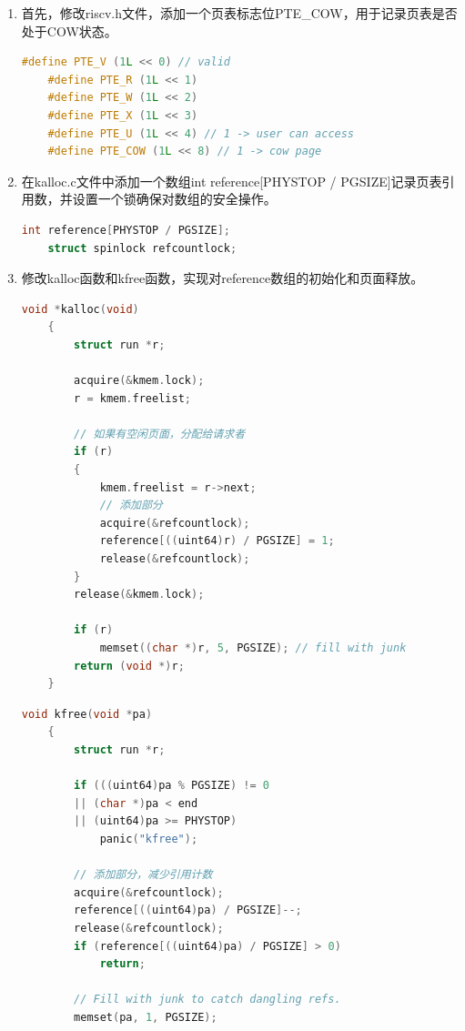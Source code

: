 \begin{enumerate}
    \item 首先，修改riscv.h文件，添加一个页表标志位PTE\_COW，用于记录页表是否处于COW状态。
          \begin{lstlisting}[language=c,title=对riscv.h文件的修改]
    #define PTE_V (1L << 0) // valid
    #define PTE_R (1L << 1)
    #define PTE_W (1L << 2)
    #define PTE_X (1L << 3)
    #define PTE_U (1L << 4) // 1 -> user can access
    #define PTE_COW (1L << 8) // 1 -> cow page
    \end{lstlisting}
    \item 在kalloc.c文件中添加一个数组int reference[PHYSTOP / PGSIZE]记录页表引用数，并设置一个锁确保对数组的安全操作。
          \begin{lstlisting}[language=c,title=添加记录引用数的数组和锁]
    int reference[PHYSTOP / PGSIZE];
    struct spinlock refcountlock;
    \end{lstlisting}
    \item 修改kalloc函数和kfree函数，实现对reference数组的初始化和页面释放。
          \begin{lstlisting}[language=c,title=对kalloc函数的修改]
    void *kalloc(void)
    {
        struct run *r;

        acquire(&kmem.lock);
        r = kmem.freelist;
        
        // 如果有空闲页面，分配给请求者
        if (r)
        {
            kmem.freelist = r->next;
            // 添加部分
            acquire(&refcountlock);
            reference[((uint64)r) / PGSIZE] = 1;
            release(&refcountlock);
        }
        release(&kmem.lock);

        if (r)
            memset((char *)r, 5, PGSIZE); // fill with junk
        return (void *)r;
    }
    \end{lstlisting}
          \begin{lstlisting}[language=c,title=对kfree函数的修改]
    void kfree(void *pa)
    {
        struct run *r;
        
        if (((uint64)pa % PGSIZE) != 0 
        || (char *)pa < end 
        || (uint64)pa >= PHYSTOP)
            panic("kfree");

        // 添加部分，减少引用计数
        acquire(&refcountlock);
        reference[((uint64)pa) / PGSIZE]--;
        release(&refcountlock);
        if (reference[((uint64)pa) / PGSIZE] > 0)
            return;

        // Fill with junk to catch dangling refs.
        memset(pa, 1, PGSIZE);


\end{lstlisting}
\end{enumerate}
